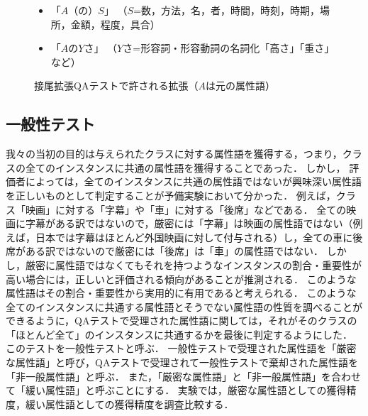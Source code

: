 \begin{figure}[t]
\begin{boxedminipage}[t]{\textwidth}
\begin{center}
\begin{itemize}
\item {\sf「$A$（の）$S$」} （$S$=数，方法，名，者，時間，時刻，時期，場所，金額，程度，具合）
\item {\sf「$A$の$Y$さ」} （{\sf$Y$さ}=形容詞・形容動詞の名詞化「高さ」「重さ」など）
\end{itemize}
\end{center}
\end{boxedminipage}
\caption{接尾拡張QAテストで許される拡張（$A$は元の属性語）}
\label{fig:suffix}
\end{figure}


\subsection{一般性テスト}
\label{sec:gen-test}
我々の当初の目的は与えられたクラスに対する属性語を獲得する，つまり，クラスの全てのインスタンスに共通の属性語を獲得することであった．
しかし， 評価者によっては，全てのインスタンスに共通の属性語ではないが興味深い属性語を正しいものとして判定することが予備実験において分かった． 
例えば，クラス「映画」に対する「字幕」や「車」に対する「後席」などである．
全ての映画に字幕がある訳ではないので，厳密には「字幕」は映画の属性語ではない（例えば，日本では字幕はほとんど外国映画に対して付与される）し，全ての車に後席がある訳ではないので厳密には「後席」は「車」の属性語ではない．
しかし，厳密に属性語ではなくてもそれを持つようなインスタンスの割合・重要性が高い場合には，正しいと評価される傾向があることが推測される． このような属性語はその割合・重要性から実用的に有用であると考えられる．
このような全てのインスタンスに共通する属性語とそうでない属性語の性質を調べることができるように，QAテストで受理された属性語に関しては，それがそのクラスの「ほとんど全て」のインスタンスに共通するかを最後に判定するようにした．
このテストを一般性テストと呼ぶ．
一般性テストで受理された属性語を「厳密な属性語」と呼び，QAテストで受理されて一般性テストで棄却された属性語を「非一般属性語」と呼ぶ． また，「厳密な属性語」と「非一般属性語」を合わせて「緩い属性語」と呼ぶことにする．
実験では，厳密な属性語としての獲得精度，緩い属性語としての獲得精度を調査比較する． 

